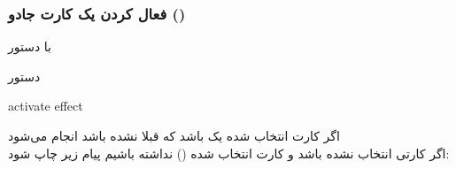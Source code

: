 \documentclass[]{article}
\begin{document}
\subsubsection*{{\titr فعال کردن یک کارت جادو ()}}
با دستور
\begin{mybox}[colback=yellow]{دستور}
	\begin{latin}	
	    activate effect	
	\end{latin}
\end{mybox}
اگر کارت انتخاب شده یک  باشد که قبلا  نشده باشد انجام 
می‌شود
\\
    اگر کارتی انتخاب نشده باشد و کارت انتخاب شده () نداشته 
    باشیم پیام زیر چاپ شود:
\end{document}
